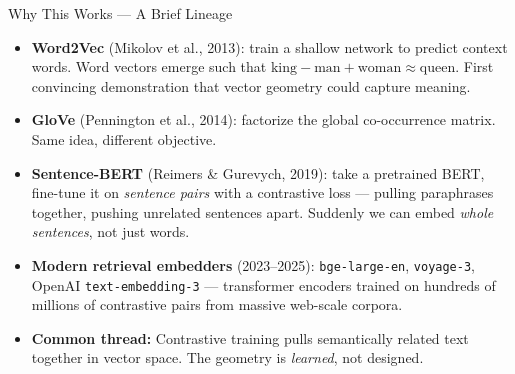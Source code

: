 \documentclass[10pt,english,aspectratio=169]{beamer}
\begin{document}
\begin{frame}{Why This Works --- A Brief Lineage}
\begin{itemize}
\item \textbf{Word2Vec} (Mikolov et al., 2013): train a shallow network to predict context words. Word vectors emerge such that $\text{king} - \text{man} + \text{woman} \approx \text{queen}$. First convincing demonstration that vector geometry could capture meaning.

\medskip
\item \textbf{GloVe} (Pennington et al., 2014): factorize the global co-occurrence matrix. Same idea, different objective.

\medskip
\item \textbf{Sentence-BERT} (Reimers \& Gurevych, 2019): take a pretrained BERT, fine-tune it on \emph{sentence pairs} with a contrastive loss --- pulling paraphrases together, pushing unrelated sentences apart. Suddenly we can embed \emph{whole sentences}, not just words.

\medskip
\item \textbf{Modern retrieval embedders} (2023--2025): \texttt{bge-large-en}, \texttt{voyage-3}, OpenAI \texttt{text-embedding-3} --- transformer encoders trained on hundreds of millions of contrastive pairs from massive web-scale corpora.

\medskip
\item \textbf{Common thread:} Contrastive training pulls semantically related text together in vector space. The geometry is \emph{learned}, not designed.
\end{itemize}
\end{frame}
\end{document}
